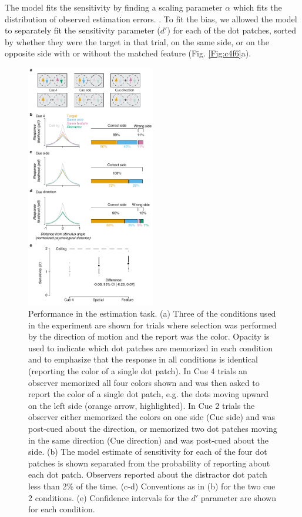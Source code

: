 The model fits the sensitivity  by finding a scaling parameter $\alpha$ which fits the distribution of observed estimation errors. . To fit the bias, we allowed the model to separately fit the sensitivity parameter ($d'$) for each of the dot patches, sorted by whether they were the target in that trial, on the same side, or on the opposite side with or without the matched feature (Fig. \ref{Fig:c4f6}a). 

\begin{figure}
\centering
\includegraphics[keepaspectratio,width=0.5\textwidth]{figs_c4/f4b_estimation_perf.pdf}
\caption[Estimation task performance]{Performance in the estimation task. (a) Three of the conditions used in the experiment are shown for trials where selection was performed by the direction of motion and the report was the color. Opacity is used to indicate which dot patches are memorized in each condition and to emphasize that the response in all conditions is identical (reporting the color of a single dot patch). In Cue 4 trials an observer memorized all four colors shown and was then asked to report the color of a single dot patch, e.g. the dots moving upward on the left side (orange arrow, highlighted). In Cue 2 trials the observer either memorized the colors on one side (Cue side) and was post-cued about the direction, or memorized two dot patches moving in the same direction (Cue direction) and was post-cued about the side. (b) The model estimate of sensitivity for each of the four dot patches is shown separated from the probability of reporting about each dot patch. Observers reported about the distractor dot patch less than 2\% of the time. (c-d) Conventions as in (b) for the two cue 2 conditions. (e) Confidence intervals for the $d'$ parameter are shown for each condition.}
\label{fig:c4f6}
\end{figure}

